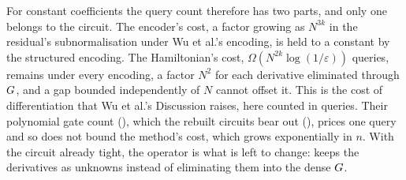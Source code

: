 For constant coefficients the query count therefore has two parts, and only one belongs to the circuit. The encoder's cost, a factor growing as $N^{3k}$ in the residual's subnormalisation under Wu et al.'s encoding, is held to a constant by the structured encoding. The Hamiltonian's cost, $\Omega(N^{2k}\log(1/\varepsilon))$ queries, remains under every encoding, a factor $N^2$ for each derivative eliminated through $G$, and a gap bounded independently of $N$ cannot offset it. This is the cost of differentiation that Wu et al.'s Discussion raises, here counted in queries. Their polynomial gate count (), which the rebuilt circuits bear out (), prices one query and so does not bound the method's cost, which grows exponentially in $n$. With the circuit already tight, the operator is what is left to change:  keeps the derivatives as unknowns instead of eliminating them into the dense $G$.
